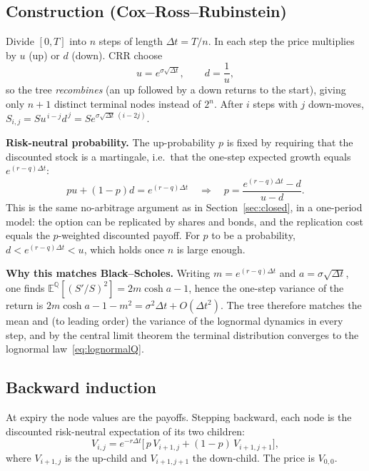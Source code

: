 \documentclass[11pt,a4paper]{article}
\newcommand{\E}{\mathbb{E}}
\newcommand{\Q}{\mathbb{Q}}
\theoremstyle{plain}
\theoremstyle{remark}
\begin{document}
\subsection{Construction (Cox--Ross--Rubinstein)}

Divide $[0,T]$ into $n$ steps of length $\Delta t=T/n$. In each step the price multiplies by $u$ (up) or $d$ (down). CRR choose
\begin{equation}\label{eq:crr}
u=e^{\sigma\sqrt{\Delta t}},\qquad d=\frac1u,
\end{equation}
so the tree \emph{recombines} (an up followed by a down returns to the start), giving only $n+1$ distinct terminal nodes
instead of $2^n$. After $i$ steps with $j$ down-moves, $S_{i,j}=Su^{\,i-j}d^{\,j}=Se^{\sigma\sqrt{\Delta t}\,(i-2j)}$.

\textbf{Risk-neutral probability.} The up-probability $p$ is fixed by requiring that the discounted
stock is a martingale, i.e.\ that the one-step expected growth equals $e^{(r-q)\Delta t}$:
\begin{equation}\label{eq:p}
pu+(1-p)d=e^{(r-q)\Delta t}\quad\Longrightarrow\quad p=\frac{e^{(r-q)\Delta t}-d}{u-d}.
\end{equation}
This is the same no-arbitrage argument as in Section~\ref{sec:closed}, in a one-period model: the option can be replicated
by shares and bonds, and the replication cost equals the $p$-weighted discounted payoff. For $p$ to be a probability,
$d<e^{(r-q)\Delta t}<u$, which holds once $n$ is large enough.

\textbf{Why this matches Black--Scholes.} Writing $m=e^{(r-q)\Delta t}$ and $a=\sigma\sqrt{\Delta t}$, one finds
$\E^\Q[(S'/S)^2]=2m\cosh a-1$, hence the one-step variance of the return is
$2m\cosh a-1-m^2=\sigma^2\Delta t+O(\Delta t^2)$.
The tree therefore matches the mean and (to leading order) the variance of the lognormal
dynamics in every step, and by the central limit theorem the terminal distribution converges to the lognormal law~\eqref{eq:lognormalQ}.

\subsection{Backward induction}

At expiry the node values are the payoffs. Stepping backward, each node is the discounted risk-neutral expectation of its two children:
\begin{equation}\label{eq:backward}
V_{i,j}=e^{-r\Delta t}\big[\,p\,V_{i+1,j}+(1-p)\,V_{i+1,j+1}\big],
\end{equation}
where $V_{i+1,j}$ is the up-child and $V_{i+1,j+1}$ the down-child. The price is $V_{0,0}$.
\end{document}
